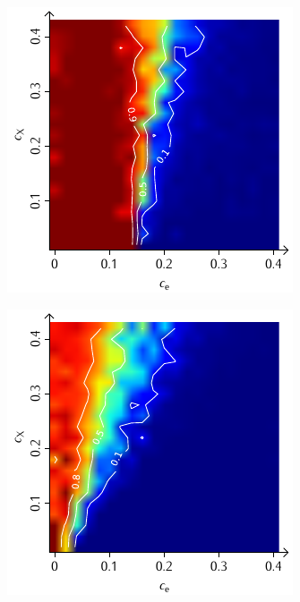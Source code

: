\documentclass[a4paper, 10pt, twoside, openany]{book} %
\begin{document}
	\begin{figure}
		\begin{minipage}[t]{0.48\textwidth}
			\includegraphics[width=\textwidth]{Abbildungen/Phasendiagramme/Konturen/H_cluster_G.pdf}
			\label{H_cluster_G}
		\end{minipage}
		\hfill
		\begin{minipage}[t]{0.48\textwidth}
			\includegraphics[width=\textwidth]{Abbildungen/Phasendiagramme/Konturen/H_penalty_cluster_G.pdf}

\end{minipage}
\end{figure}
\end{document}
